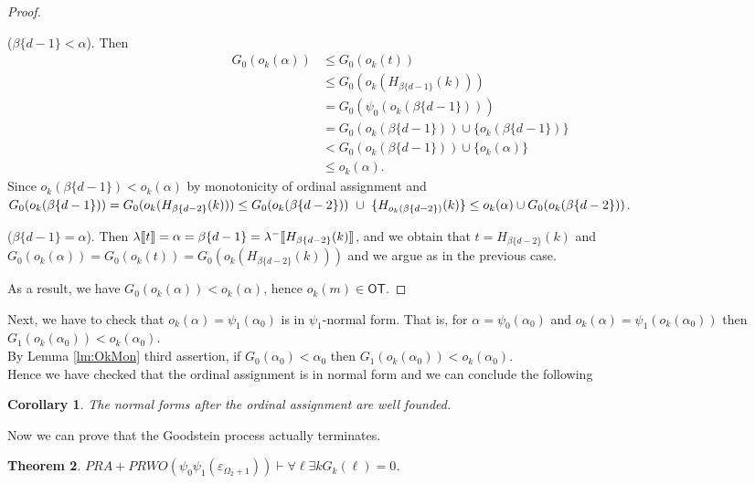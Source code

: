 \documentclass{amsart}
\theoremstyle{plain}
\theoremstyle{plain}
\newtheorem{theorem}{Theorem}
\newtheorem{corollary}[theorem]{Corollary}
\def\scbrl{[\hspace{-.14em}[}
\def\scbrr{]\hspace{-.14em}]}
\def\scbr#1{\scbrl#1\scbrr}
\newcommand\OT{\mathsf{OT}}
\newcommand{\Om}{{\Omega}}
\newcommand{\ok}{o_{k}}
\newcommand{\al}{{\alpha}}
\newcommand{\be}{{\beta}}
\newcommand{\la}{\lambda}
\def\scbrl{[\hspace{-.14em}[}
\def\scbrr{]\hspace{-.14em}]}
\def\scbr#1{\scbrl#1\scbrr}
\begin{document}
\begin{proof}
\begin{Cases}
\begin{Cases}
    \item ($\be\{d-1\} < \al$). Then
    \begin{align*}
        G_0(\ok(\al))& \leq G_0(\ok(t)) \\
        &\leq G_0(\ok( H_{\be\{d-1\} }(k))) \\
        &= G_0(\psi_0( {\ok(\be\{d-1\})}))\\
        &= G_0(\ok(\be\{d-1\})) \cup \{\ok(\be\{d-1\})\} \\
        &< G_0(\ok(\be\{d-1\})) \cup \{ \ok(\al)\} 	\\
        &\leq \ok(\al).
    \end{align*}
    Since $\ok(\be\{d-1\}) < \ok(\al)$ by monotonicity of ordinal assignment and
    \\
    $ G_0(\ok(\be\{d-1\})) =G_0(\ok(H_{\be\{d-2\}}(k))) 
    \leq G_0(\ok(\be\{d-2\}))~\cup~ \{H_{\ok(\be\{d-2\})}(k)\}\\
    \leq \ok(\al) \cup G_0(\ok(\be\{d-2\})) $.
%
    \\
    \item ($\be\{d-1\} = \al$). Then
    $\la\scbr{t}=\al=\be\{d-1\} = \la^-\scbr{H_{\be\{d-2\}}(k)}$, 
    and we obtain that $t=H_{\be\{d-2\}}(k)$ and
    $G_0(\ok(\al))= G_0(\ok(t)) = G_0(\ok(H_{\be\{d-2\}}(k)))$ and we argue as in the previous case. 
\end{Cases}
\end{Cases}
As a result, we have 
$G_0(\ok(\al))  < \ok(\al) $, hence $\ok(m)\in \OT$.
\end{proof}
Next, we have to check that $\ok(\al)  = \psi_1(\al_0)$ is in $\psi_1$-normal form.
That is, for  $\al=\psi_0(\al_0)$ and  $\ok(\al) =\psi_1(\ok(\al_0))$  then $G_1(\ok(\al_0)) < \ok(\al_0)$.\\ By Lemma \ref{lm:OkMon} third assertion, if $G_0(\al_0)<\al_0$ then $G_1(\ok(\al_0))<\ok(\al_0)$.\\
Hence we have checked that the ordinal assignment is in normal form and we can conclude the following

\begin{corollary}
The normal forms after the ordinal assignment are well founded.
\end{corollary}

Now we can prove that the Goodstein process actually terminates.
\begin{theorem}
$PRA+ PRWO(\psi_0\psi_1(\varepsilon_{\Om_2+1})) \vdash \forall \ell \exists k G_k(\ell)=0$.
\end{theorem}
\end{document}
